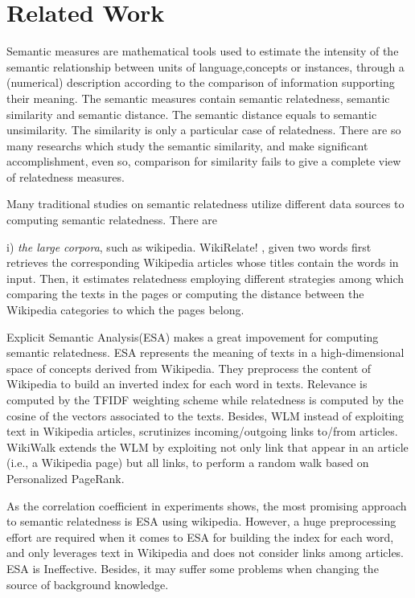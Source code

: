 \section{Related Work}
Semantic measures are mathematical tools used to estimate the intensity of the 
semantic relationship between units of language,concepts or instances, through 
a (numerical) description according to the comparison of information 
supporting their meaning. The semantic measures contain semantic relatedness,
semantic similarity and semantic distance. The semantic distance equals to semantic 
unsimilarity. The similarity is only a particular case of relatedness.
There are so many researchs \cite{acl/IacobacciPN15, tkde/ZhuI17, tkde/LiBM03}
which study the semantic similarity, and make significant accomplishment, even so,
comparison for similarity fails to give a complete view of relatedness measures.

Many traditional studies on semantic relatedness
utilize different data sources to computing semantic relatedness. There are

i) \emph{the large corpora}, such as wikipedia. 
WikiRelate! \cite{aaai/StrubeP06}, given two words
first retrieves the corresponding Wikipedia articles whose titles
contain the words in input. Then, it estimates relatedness
employing different strategies among which comparing
the texts in the pages or computing the distance between
the Wikipedia categories to which the pages belong.

Explicit Semantic Analysis(ESA) \cite{ijcai/GabrilovichM07} makes a great impovement for computing semantic relatedness. 
ESA represents the meaning of texts in a high-dimensional space of concepts derived from Wikipedia.
They preprocess the content of Wikipedia to build an inverted index for each word in texts.
Relevance is computed by the TFIDF weighting scheme while relatedness is computed by
the cosine of the vectors associated to the texts.
Besides, WLM \cite{aaai/Milne08} instead of exploiting text in Wikipedia articles, 
scrutinizes incoming/outgoing links to/from articles. WikiWalk \cite{textgraphs/YehRMAS09} extends the
WLM by exploiting not only link that appear in an article (i.e., a Wikipedia page) but all 
links, to perform a random walk based on Personalized PageRank.

As the correlation coefficient in experiments shows, the most promising approach to semantic relatedness
is ESA using wikipedia. 
However, a huge preprocessing effort are required when it comes to ESA for building the index for each word,
and only leverages text in Wikipedia and does not consider links among articles. ESA is Ineffective.
Besides, it may suffer some problems when changing the source of background knowledge.

